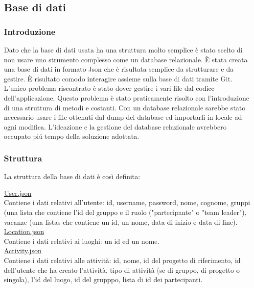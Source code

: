 \documentclass[12pt]{scrartcl}
\begin{document}
\subsection{Base di dati}
\subsubsection{Introduzione}
    Dato che la base di dati usata ha una struttura molto semplice \`e stato scelto
    di non usare uno strumento complesso come un database relazionale. 
    \`E stata creata una base di dati in formato Json che \`e risultata semplice da
    strutturare e da gestire. \`E risultato comodo interagire assieme sulla base
    di dati tramite Git. L'unico problema riscontrato \`e stato dover gestire i vari
    file dal codice dell'applicazione. Questo problema \`e stato praticamente risolto
    con l'introduzione di una struttura di metodi e costanti.
    Con un database relazionale sarebbe stato necessario usare
    i file ottenuti dal dump del database ed importarli in locale ad ogni modifica.
    L'ideazione e la gestione del database relazionale avrebbero occupato pi\'u tempo
    della soluzione adottata.
\subsubsection{Struttura}
    La struttura della base di dati \`e cos\`i definita:
    
    
        \underline{User.json}\\
        Contiene i dati relativi all'utente: id, username, password, nome, cognome, gruppi (una lista che
        contiene l'id del gruppo e il ruolo ("partecipante" o "team leader"), vacanze (una listas che
        contiene un id, un nome, data di inizio e data di fine).\\
    
    \underline{Location.json}\\
        Contiene i dati relativi ai luoghi: un id ed un nome.\\
    
    \underline{Activity.json}\\
        Contiene i dati relativi alle attivit\`a: id, nome, id del progetto di riferimento, 
        id dell'utente che ha creato l'attivit\`a, tipo di attivit\`a (se di gruppo, di progetto
        o singola), l'id del luogo, id del grupppo, lista di id dei partecipanti.\\
    
\end{document}
